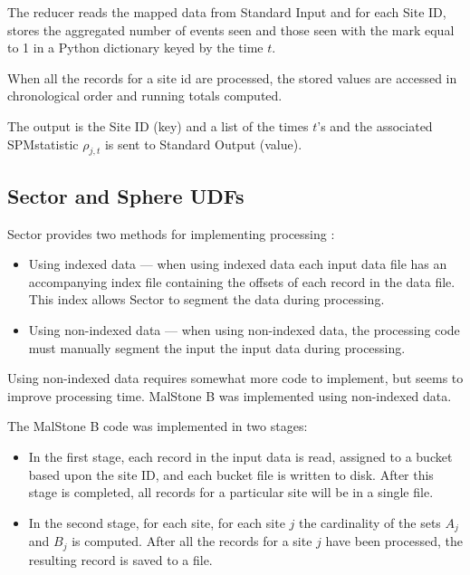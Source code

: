 \documentclass{acm_proc_article-sp}
\def\spm{\mbox{SPM}}
\def\malstone{MalStone } \def\malgen{MalGen }
\begin{document}
The reducer reads the mapped data from Standard Input and for each
Site ID, stores the aggregated number of events seen and those seen
with the mark equal to 1 in a Python dictionary keyed by the time $t$.

When all the records for a site id are processed, the stored values
are accessed in chronological order and running totals computed.

The output is the Site ID (key) and a list of the times $t$'s and the
associated \spm  statistic $\rho_{j,t}$ is sent to Standard Output (value).

\subsection{Sector and Sphere UDFs}

Sector provides two methods for implementing processing  \cite{Grossman:PTRSA09}: 

\begin{itemize}

\item Using indexed data --- when using indexed data each input data
  file has an accompanying index file containing the offsets of each
  record in the data file. This index allows Sector to segment the
  data during processing.

\item Using non-indexed data --- when using non-indexed data, the
  processing code must manually segment the input the input data during processing.

\end{itemize}

Using non-indexed data requires somewhat more code to implement, but
seems to improve processing time.  \malstone B was implemented using
non-indexed data.

The \malstone B code was implemented in two stages:

\begin{itemize}

\item In the first stage, each record in the input data is read, assigned to a bucket based upon the site ID, and each bucket file is written to disk.  After this stage is completed, all records for a particular site will be in a single file.

\item In the second stage, for each site, for each site $j$ the cardinality of the sets $A_j$ and $B_j$ is computed.  After all the records for a site $j$ have been processed, the resulting record is saved to a file.

\end{itemize}
\end{document}
